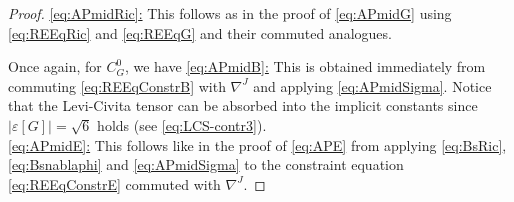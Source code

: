 \documentclass[11pt,leqno,textwidth=10cm]{amsart}
\numberwithin{equation}{section}
\theoremstyle{definition}
\theoremstyle{plain}
\newcommand{\1}{\mathbbm{1}}
\newcommand{\Ric}{\text{\normalfont{Ric}}}
\renewcommand{\epsilon}{\varepsilon}
\newcommand{\del}{\partial}
\newcommand{\change}[1]{\color{black}#1\color{black}}
\begin{document}
\begin{proof}
\change{\underline{\eqref{eq:APmidRic}:} This follows as in the proof of \eqref{eq:APmidG} using \eqref{eq:REEqRic} and \eqref{eq:REEqG} and their commuted analogues.}

Once again, for $C^0_G$, we have
%
\underline{\eqref{eq:APmidB}:} This is obtained immediately from commuting \eqref{eq:REEqConstrB} with $\nabla^J$ and applying \eqref{eq:APmidSigma}. Notice that the Levi-Civita tensor can be absorbed into the implicit constants since $\lvert\epsilon[G]\rvert=\sqrt{6}$ holds (see \eqref{eq:LCS-contr3}).\\

\underline{\eqref{eq:APmidE}:} This follows like in the proof of \eqref{eq:APE} from applying \eqref{eq:BsRic}, \eqref{eq:Bsnablaphi} and \eqref{eq:APmidSigma} to the constraint equation \eqref{eq:REEqConstrE} commuted with $\nabla^J$.


\end{proof}
\end{document}
